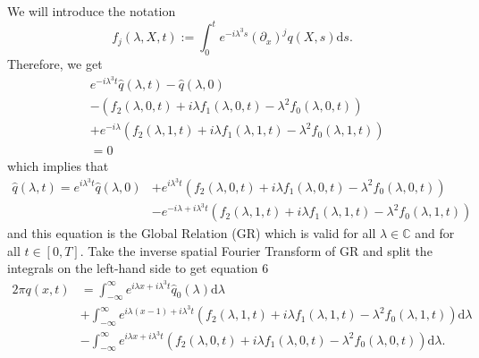 We will introduce the notation
$$f_j(\lambda,X,t) := \int_0^t e^{-i\lambda^3 s}(\partial_x)^j q(X,s) \mathrm{d}s.$$
Therefore, we get
\begin{align*}
&e^{-i\lambda^3 t} \widehat{q}(\lambda,t) - \widehat{q}(\lambda,0) \\
&-\left(f_2(\lambda,0,t) + i\lambda f_1(\lambda,0,t) - \lambda^2 f_0(\lambda,0,t)\right) \\
&+e^{-i\lambda}\left(f_2(\lambda,1,t) + i\lambda f_1(\lambda,1,t) - \lambda^2 f_0(\lambda,1,t)\right) \\
&= 0
\end{align*}
which implies that
\begin{align*}
\widehat{q}(\lambda,t) = e^{i\lambda^3 t} \widehat{q}(\lambda,0) &+e^{i\lambda^3 t}\left(f_2(\lambda,0,t) + i\lambda f_1(\lambda,0,t) - \lambda^2 f_0(\lambda,0,t)\right) \\
&-e^{-i\lambda+i\lambda^3 t}\left(f_2(\lambda,1,t) + i\lambda f_1(\lambda,1,t) - \lambda^2 f_0(\lambda,1,t)\right)
\end{align*}
and this equation is the Global Relation (GR) which is valid for all $\lambda \in \mathbb{C}$ and for all $t \in [0,T]$. Take the inverse spatial Fourier Transform of GR and split the integrals on the left-hand side to get equation 6
\begin{align}
2\pi q(x,t) &= \int_{-\infty}^{\infty} e^{i\lambda x + i\lambda^3 t} \widehat{q}_0(\lambda) \mathrm{d}\lambda \label{eqn:IFT_GR}\\ 
&+ \int_{-\infty}^{\infty} e^{i\lambda (x-1)+i\lambda^3 t}\left(f_2(\lambda,1,t) + i\lambda f_1(\lambda,1,t) - \lambda^2 f_0(\lambda,1,t)\right) \mathrm{d}\lambda \nonumber \\
&- \int_{-\infty}^{\infty} e^{i\lambda x+i\lambda^3 t}\left(f_2(\lambda,0,t) + i\lambda f_1(\lambda,0,t) - \lambda^2 f_0(\lambda,0,t)\right) \mathrm{d}\lambda. \nonumber
\end{align}

